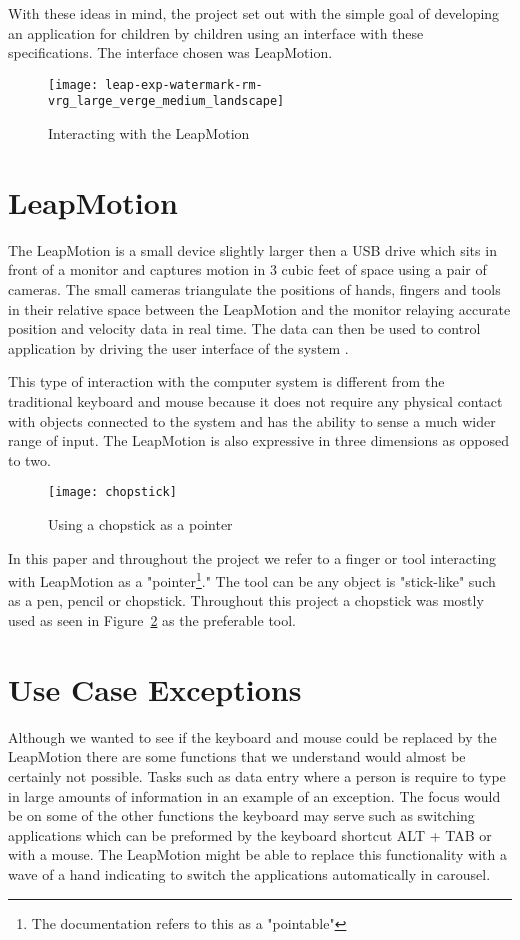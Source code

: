 With these ideas in mind, the project set out with the simple goal of developing an application for children by children using an interface with these specifications. The interface chosen was LeapMotion.


\begin{figure}
\centering

\texttt{[image: leap-exp-watermark-rm-vrg\_large\_verge\_medium\_landscape]}
\caption{Interacting with the LeapMotion \cite{theverge} }
\label{fig:leapmotionpicture}
\end{figure}

\section{LeapMotion}

The LeapMotion is a small device slightly larger then a USB drive which sits in front of a monitor and captures motion in 3 cubic feet of space using a pair of cameras. The small cameras triangulate the positions of hands, fingers and tools in their relative space between the LeapMotion and the monitor relaying accurate position and velocity data in real time. The data can then be used to control application by driving the user interface of the system \cite{leapmotion}. 

This type of interaction with the computer system is different from the traditional keyboard and mouse because it does not require any physical contact with objects connected to the system and has the ability to sense a much wider range of input. The LeapMotion is also expressive in three dimensions as opposed to two.

\begin{figure}
\centering

\texttt{[image: chopstick]}
\caption{Using a chopstick as a pointer}
\label{fig:chopstick}
\end{figure}
In this paper and throughout the project we refer to a finger or tool interacting with LeapMotion as a "pointer\footnote{The documentation refers to this as a "pointable"}." The tool can be any object is "stick-like" such as a pen, pencil or chopstick. Throughout this project a chopstick was mostly used as seen in Figure~\ref{fig:chopstick} as the preferable tool.

\section{Use Case Exceptions}
Although we wanted to see if the keyboard and mouse could be replaced by the LeapMotion there are some functions that we understand would almost be certainly not possible. Tasks such as data entry where a person is require to type in large amounts of information in an example of an exception. The focus would be on some of the other functions the keyboard may serve such as switching applications which can be preformed by the keyboard shortcut ALT + TAB or with a mouse. The LeapMotion might be able to replace this functionality with a wave of a hand indicating to switch the applications automatically in carousel. 

